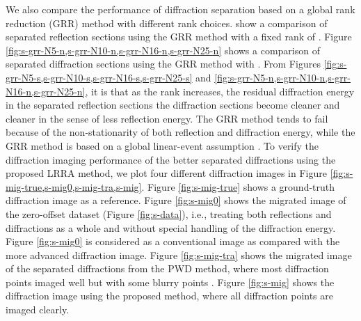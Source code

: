 We also compare the performance of diffraction separation based on a global rank reduction (GRR) method \cite[]{mssa,Chen2016Simultaneous,lin2020diffraction} with different rank choices.  show a comparison of separated reflection sections using the GRR method with a fixed rank of  . Figure \ref{fig:s-grr-N5-n,s-grr-N10-n,s-grr-N16-n,s-grr-N25-n} shows a comparison of separated diffraction sections using the GRR method with . From Figures \ref{fig:s-grr-N5-s,s-grr-N10-s,s-grr-N16-s,s-grr-N25-s} and \ref{fig:s-grr-N5-n,s-grr-N10-n,s-grr-N16-n,s-grr-N25-n}, it is  that as the rank increases, the residual diffraction energy in the separated reflection sections the diffraction sections become cleaner and cleaner in the sense of less reflection energy.  The GRR method tends to fail because of the non-stationarity of both reflection and diffraction energy, while the GRR method is based on a global linear-event assumption \cite[]{mssa}.  To verify the diffraction imaging performance of the better separated diffractions using the proposed LRRA method, we plot four different diffraction images in Figure \ref{fig:s-mig-true,s-mig0,s-mig-tra,s-mig}. Figure \ref{fig:s-mig-true} shows a ground-truth diffraction image as a reference. Figure \ref{fig:s-mig0} shows the migrated image of the zero-offset dataset (Figure \ref{fig:s-data}), i.e., treating both reflections and diffractions as a whole and without special handling of the diffraction energy. Figure \ref{fig:s-mig0} is considered as a conventional image as compared with the more advanced diffraction image. Figure \ref{fig:s-mig-tra} shows the migrated image of the separated diffractions from the PWD method, where most diffraction points  imaged well but with some blurry points . Figure \ref{fig:s-mig} shows the diffraction image using the proposed method, where all diffraction points are imaged clearly. 